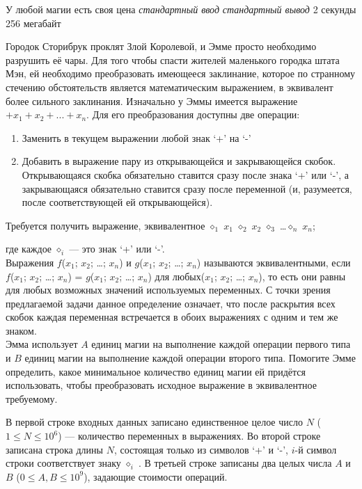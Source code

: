 \begin{problem}%
{У любой магии есть своя цена}%
{\textsl{стандартный ввод}}%
{\textsl{стандартный вывод}}%
{2 секунды}%
{256 мегабайт}{}

Городок Сторибрук проклят Злой Королевой, и Эмме просто необходимо разрушить её чары. Для того чтобы спасти жителей маленького городка штата Мэн, ей необходимо преобразовать имеющееся заклинание, которое по странному стечению обстоятельств является математическим выражением, в эквивалент более сильного заклинания. Изначально у Эммы имеется выражение $+x_1+x_2+...+x_n$. Для его преобразования доступны две операции:

\begin{enumerate}
    \item Заменить в текущем выражении любой знак ‘+’ на ‘-’
    \item Добавить в выражение пару из открывающейся и закрывающейся скобок. Открывающаяся скобка обязательно ставится сразу после знака ‘+’ или ‘-’, а закрывающаяся обязательно ставится сразу после переменной (и, разумеется, после соответствующей ей открывающейся).
\end{enumerate}

Требуется получить выражение, эквивалентное $\diamond_1$ $x_1$ $\diamond_2$ $x_2$ $\diamond_3$ \dots $\diamond_n$ $x_n$;

где каждое $\diamond_i$  — это знак ‘+’ или ‘-’.\\

Выражения $f$($x_1$; $x_2$; \dots ; $x_n$) и $g$($x_1$; $x_2$; \dots ; $x_n$) называются эквивалентными, если $f$($x_1$; $x_2$; \dots ; $x_n$) = $g$($x_1$; $x_2$; \dots ; $x_n$) для любых($x_1$; $x_2$; \dots ; $x_n$), то есть они равны для любых возможных значений используемых переменных. С точки зрения предлагаемой задачи данное определение означает, что после раскрытия всех скобок каждая переменная встречается в обоих выражениях с одним и тем же знаком.\\

Эмма использует $A$ единиц магии на выполнение каждой операции первого типа и $B$ единиц магии на выполнение каждой операции второго типа. Помогите Эмме определить, какое минимальное количество единиц магии ей придётся использовать, чтобы преобразовать исходное выражение в эквивалентное требуемому.

\InputFile

В первой строке входных данных записано единственное целое число $N$ ($1 \le N \le 10^6$) — количество переменных в выражениях. Во второй строке записана строка длины $N$, состоящая только из символов ‘+’ и ‘-’, $i$-й символ строки соответствует знаку $\diamond_i$ . В третьей строке записаны два целых числа $A$ и $B$ ($0 \le A, B \le 10^9$), задающие стоимости операций.


\end{problem}
